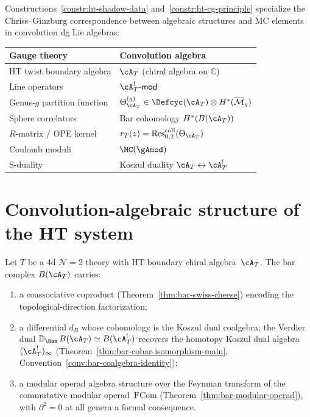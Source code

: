 \begin{remark}[Dictionary]
\label{rem:ht-cg-dictionary}
Constructions~\ref{constr:ht-shadow-data} and~\ref{constr:ht-cg-principle} specialize the Chriss--Ginzburg
correspondence between algebraic structures and MC elements in
convolution dg Lie algebras:
\begin{center}
\renewcommand{\arraystretch}{1.2}
\begin{tabular}{ll}
\toprule
\textbf{Gauge theory} & \textbf{Convolution algebra} \\
\midrule
HT twist boundary algebra & $\cA_T$ (chiral algebra on $\mathbb{C}$) \\
Line operators & $\cA_T^!\text{-}\mathsf{mod}$ \\
Genus-$g$ partition function &
$\Theta_{\cA_T}^{(g)} \in \Defcyc(\cA_T) \otimes
H^*(\overline{\mathcal{M}}_g)$ \\
Sphere correlators & Bar cohomology $H^*(B(\cA_T))$ \\
$R$-matrix / OPE kernel &
$r_T(z) = \operatorname{Res}^{\mathrm{coll}}_{0,2}(\Theta_{\cA_T})$ \\
Coulomb moduli & $\MC(\gAmod)$ \\
S-duality & Koszul duality $\cA_T \leftrightarrow \cA_T^!$ \\
\bottomrule
\end{tabular}
\end{center}
\end{remark}

\section{Convolution-algebraic structure of the HT system}
\label{sec:ht-convolution-structure}

\begin{proposition}
\label{prop:ht-bar-genus-zero}
Let $T$ be a $4$d $\mathcal{N}=2$ theory with HT boundary chiral
algebra~$\cA_T$. The bar complex $B(\cA_T)$ carries:
\begin{enumerate}[label=\textup{(\roman*)}]
\item a coassociative coproduct
 \textup{(}Theorem~\textup{\ref{thm:bar-swiss-cheese}}\textup{)}
 encoding the topological-direction factorization;
\item a differential $d_B$ whose cohomology is the Koszul dual
 coalgebra; the Verdier dual
 $\mathbb{D}_{\Ran}\,B(\cA_T) \simeq B(\cA_T^!)$
 recovers the homotopy Koszul dual algebra $(\cA_T^!)_\infty$
 \textup{(}Theorem~\textup{\ref{thm:bar-cobar-isomorphism-main}},
 Convention~\textup{\ref{conv:bar-coalgebra-identity}}\textup{)};
\item a modular operad algebra structure over the Feynman transform of
 the commutative modular operad~$\mathrm{FCom}$
 \textup{(}Theorem~\textup{\ref{thm:bar-modular-operad}}\textup{)},
 with $\partial^2 = 0$ at all genera a formal consequence.
\end{enumerate}
\end{proposition}

